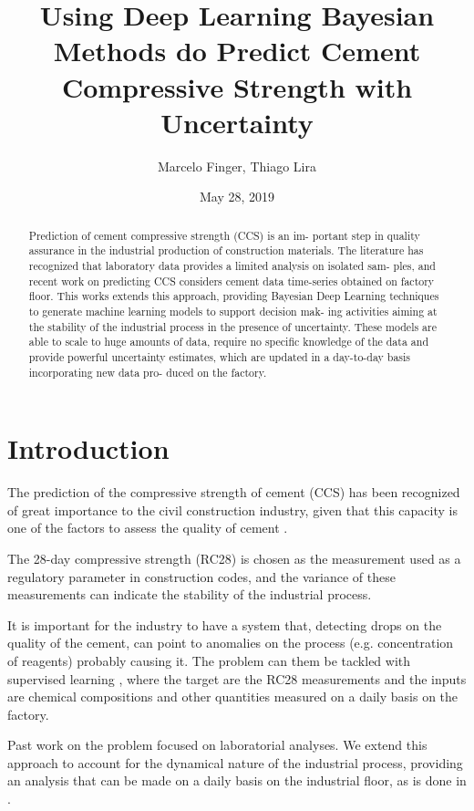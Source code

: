 \documentclass[a4paper]{article}
\author{Marcelo Finger, Thiago Lira}
\date{May 28, 2019}
\title{Using Deep Learning Bayesian Methods do Predict Cement Compressive Strength with Uncertainty}
\begin{document}
\maketitle
\begin{abstract}
Prediction of cement compressive strength (CCS) is an im-
portant step in quality assurance in the industrial production
of construction materials. The literature has recognized that
laboratory data provides a limited analysis on isolated sam-
ples, and recent work on predicting CCS considers cement
data time-series obtained on factory floor. This works extends
this approach, providing Bayesian Deep Learning techniques
to generate machine learning models to support decision mak-
ing activities aiming at the stability of the industrial process
in the presence of uncertainty. These models are able to scale
to huge amounts of data, require no specific knowledge of the
data and provide powerful uncertainty estimates, which are
updated in a day-to-day basis incorporating new data pro-
duced on the factory.
\end{abstract}


\section{Introduction}
\label{sec:org605e643}
The prediction of the compressive strength of cement (CCS) has been recognized of great importance to the civil construction industry, 
given that this capacity is one of the factors to assess the quality of cement \cite{cementnn0}.

The 28-day compressive strength (RC28) is chosen as the measurement used as a regulatory parameter in construction codes, and the variance of these measurements can 
indicate the stability of the industrial process. 

It is important for the industry to have a system that, detecting drops on the quality of the cement, can point to anomalies on the process (e.g. concentration of reagents) 
probably causing it. The problem can them be tackled with supervised learning \cite{dlbook}, where the target are the RC28 measurements and the inputs are chemical compositions and other 
quantities measured on a daily basis on the factory.

Past work \cite{cementlin,nncement} on the problem focused on laboratorial analyses. We extend this approach to account for the dynamical nature of the industrial process, providing 
an analysis that can be made on a daily basis on the industrial floor, as is done in \cite{dynstat}.
\end{document}
